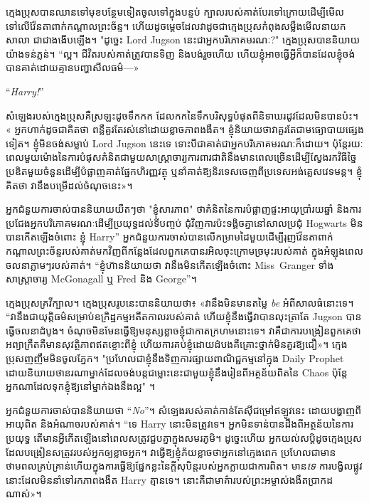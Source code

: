 ក្មេងប្រុសបានឈានទៅមុខបន្ថែមទៀតចូលទៅក្នុងបន្ទប់ ក្បាលរបស់គាត់បែរទៅក្រោយដើម្បីមើលទៅលើវ៉ែនតាពាក់កណ្តាលព្រះច័ន្ទ។ ហើយដូចម្ដេចដែលវាដូចជាក្មេងប្រុសកំពុងសម្លឹងមើលនាយកសាលា ជាជាងងើបឡើង។ "ដូច្នេះ Lord Jugson នេះជាអ្នកបរិភោគមរណៈ?" ក្មេងប្រុសបាននិយាយយ៉ាងទន់ភ្លន់។ “ល្អ។ ជីវិត​របស់​គាត់​ត្រូវ​បាន​ទិញ និង​បង់​រួច​ហើយ ហើយ​ខ្ញុំ​អាច​ធ្វើ​អ្វី​ក៏​បាន​ដែល​ខ្ញុំ​ចង់​បាន​គាត់​ដោយ​គ្មាន​បញ្ហា​សីលធម៌—»

“\emph{Harry!}”

សំឡេង​របស់​ក្មេង​ប្រុស​គឺ​ស្រឡះ​ដូច​ទឹក​កក ដែល​កក​នៃ​ទឹក​បរិសុទ្ធ​បំផុត​ពី​និទាឃរដូវ​ដែល​មិន​បាន​ប៉ះ។ « អ្នក​ហាក់​ដូច​ជា​គិត​ថា ពន្លឺ​គួរ​តែ​រស់​នៅ​ដោយ​ខ្លាច​ភាព​ងងឹត។ ខ្ញុំនិយាយថាវាគួរតែជាមធ្យោបាយផ្សេងទៀត។ ខ្ញុំមិនចង់សម្លាប់ Lord Jugson នេះទេ ទោះបីជាគាត់ជាអ្នកបរិភោគមរណៈក៏ដោយ។ ប៉ុន្តែរយៈពេលមួយម៉ោងនៃការបំផុសគំនិតជាមួយសាស្រ្តាចារ្យការពារជាតិនឹងមានពេលច្រើនដើម្បីស្វែងរកវិធីច្នៃប្រឌិតមួយចំនួនដើម្បីបំផ្លាញគាត់ផ្នែកហិរញ្ញវត្ថុ ឬនាំគាត់ឱ្យនិរទេសចេញពីប្រទេសអង់គ្លេសវេទមន្ត។ ខ្ញុំ​គិត​ថា វា​នឹង​បម្រើ​ដល់​ចំណុច​នេះ»។

អ្នកជំនួយការចាស់បាននិយាយយឺតៗថា "ខ្ញុំសារភាព" ថាគំនិតនៃការបំផ្លាញផ្ទះអាយុប្រាំរយឆ្នាំ និងការប្រជែងអ្នកបរិភោគមរណៈដើម្បីប្រយុទ្ធដល់ទីបញ្ចប់ ជុំវិញការប៉ះទង្គិចគ្នានៅសាលប្រជុំ Hogwarts មិនបានកើតឡើងចំពោះ ខ្ញុំ Harry” អ្នកជំនួយការចាស់បានលើកម្រាមដៃមួយដើម្បីរុញវ៉ែនតាពាក់កណ្តាលព្រះច័ន្ទរបស់គាត់មកវិញពីកន្លែងដែលពួកគេបានរអិលចុះក្រោមច្រមុះរបស់គាត់ ក្នុងអំឡុងពេលចលនាភ្លាមៗរបស់គាត់។ “ខ្ញុំហ៊ាននិយាយថា វានឹងមិនកើតឡើងចំពោះ Miss~Granger ទាំងសាស្រ្តាចារ្យ McGonagall ឬ Fred និង George”។

ក្មេងប្រុសគ្រវីក្បាល។ ក្មេង​ប្រុស​រូប​នេះ​បាន​និយាយ​ថា៖ «វា​នឹង​មិន​មាន​តម្លៃ \emph{be} អំពី​សាល​ធំ​នោះ​ទេ។ “វានឹងជាយុត្តិធម៌សម្រាប់ឧក្រិដ្ឋកម្មអតីតកាលរបស់គាត់ ហើយខ្ញុំនឹងធ្វើវាបានលុះត្រាតែ Jugson បានធ្វើចលនាដំបូង។ ចំណុច​មិន​មែន​ធ្វើ​ឱ្យ​មនុស្ស​ខ្លាច​ខ្ញុំ​ជា​កាត​ក្រហម​នោះ​ទេ។ វា​គឺ​ជា​ការ​បង្រៀន​ពួកគេ​ថា​អព្យាក្រឹត​គឺ​មាន​សុវត្ថិភាព​ឥតខ្ចោះ​ពី​ខ្ញុំ ហើយ​ការ​គប់​ខ្ញុំ​ដោយ​ដំបង​គឺ​គ្រោះថ្នាក់​មិន​គួរ​ឱ្យ​ជឿ»។ ក្មេង​ប្រុស​ញញឹម​មិន​ចូល​ភ្នែក។ "ប្រហែលជាខ្ញុំនឹងទិញការផ្សាយពាណិជ្ជកម្មនៅក្នុង Daily Prophet ដោយនិយាយថានរណាម្នាក់ដែលចង់បន្តជម្លោះនេះជាមួយខ្ញុំនឹងរៀនពីអត្ថន័យពិតនៃ Chaos ប៉ុន្តែអ្នកណាដែលទុកខ្ញុំឱ្យនៅម្នាក់ឯងនឹងល្អ" ។

អ្នកជំនួយការចាស់បាននិយាយថា “\emph{No}”។ សំឡេងរបស់គាត់កាន់តែស៊ីជម្រៅឥឡូវនេះ ដោយបង្ហាញពីអាយុពិត និងអំណាចរបស់គាត់។ “ទេ Harry នោះមិនត្រូវទេ។ អ្នកមិនទាន់បានដឹងពីអត្ថន័យនៃការប្រយុទ្ធ តើមានអ្វីកើតឡើងនៅពេលសត្រូវជួបគ្នាក្នុងសមរភូមិ។ ដូច្នេះ​ហើយ អ្នក​យល់​សប្តិ​ដូច​ក្មេង​ប្រុស​ដែល​បង្រៀន​សត្រូវ​របស់​អ្នក​ឲ្យ​ខ្លាច​អ្នក។ វាធ្វើឱ្យខ្ញុំភ័យខ្លាចថាអ្នកនៅក្មេងពេក ប្រហែលជាមានថាមពលគ្រប់គ្រាន់ហើយក្នុងការធ្វើឱ្យផ្នែកខ្លះនៃក្តីសុបិន្តរបស់អ្នកក្លាយជាការពិត។ មាន\emph{ទេ} ការបង្វិលផ្លូវនោះដែលមិននាំទៅរកភាពងងឹត Harry គ្មានទេ។ នោះ​គឺ​ជា​មាគ៌ា​របស់​ព្រះអម្ចាស់​ងងឹត​ប្រាកដ​ណាស់»។

